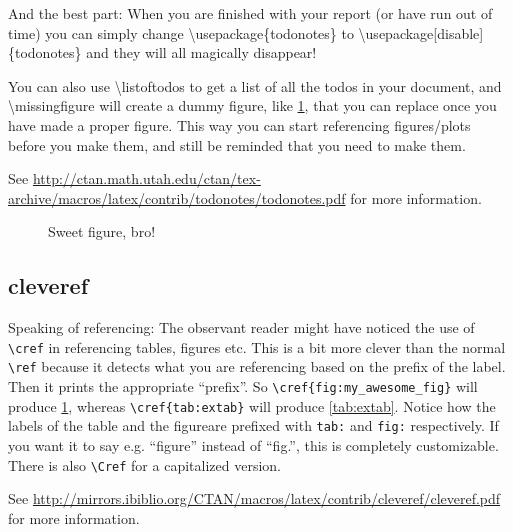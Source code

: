 And the best part: When you are finished with your report (or have run out of time) you can simply change \textbackslash usepackage\{todonotes\} to \textbackslash usepackage[disable]\{todonotes\} and they will all magically disappear!

You can also use \textbackslash listoftodos to get a list of all the todos in your document, and \textbackslash missingfigure will create a dummy figure, like \cref{fig:my_awesome_fig}, that you can replace once you have made a proper figure. This way you can start referencing figures/plots before you make them, and still be reminded that you need to make them.

See \url{http://ctan.math.utah.edu/ctan/tex-archive/macros/latex/contrib/todonotes/todonotes.pdf} for more information.
\begin{figure}[h]
    \centering
    \caption{Sweet figure, bro!}
    \label{fig:my_awesome_fig}
\end{figure}

\subsection{cleveref}
Speaking of referencing: The observant reader might have noticed the use of \texttt{\textbackslash cref} in referencing tables, figures etc. This is a bit more clever than the normal \texttt{\textbackslash ref} because it detects what you are referencing based on the prefix of the label. Then it prints the appropriate ``prefix''. So \texttt{\textbackslash cref\{fig:my\_awesome\_fig\}} will produce \cref{fig:my_awesome_fig}, whereas \texttt{\textbackslash cref\{tab:extab\}} will produce \cref{tab:extab}. Notice how the labels of the table and the figureare prefixed with \texttt{tab:} and \texttt{fig:} respectively. If you want it to say e.g. ``figure'' instead of ``fig.'', this is completely customizable. There is also \texttt{\textbackslash Cref} for a capitalized version.

See \url{http://mirrors.ibiblio.org/CTAN/macros/latex/contrib/cleveref/cleveref.pdf} for more information.
